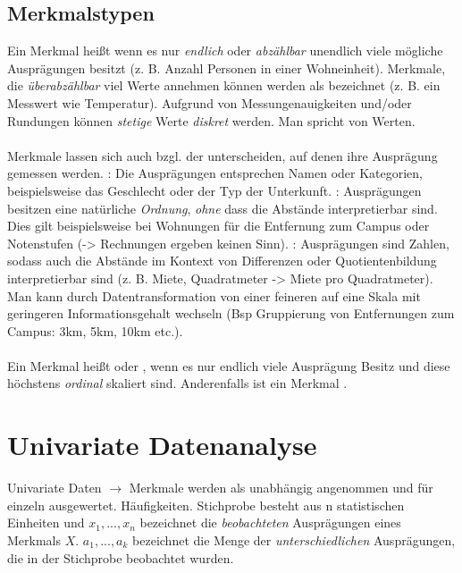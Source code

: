 \subsection{Merkmalstypen}
Ein Merkmal heißt  wenn es nur \emph{endlich} oder \emph{abzählbar} unendlich viele mögliche Ausprägungen besitzt (z. B. Anzahl Personen in einer Wohneinheit). Merkmale, die \emph{überabzählbar} viel Werte annehmen können werden als   bezeichnet (z. B. ein Messwert wie Temperatur). Aufgrund von Messungenauigkeiten und/oder Rundungen können \emph{stetige} Werte \emph{diskret} werden. Man spricht von  Werten. 
\\\\
Merkmale lassen sich auch bzgl. der  unterscheiden, auf denen ihre Ausprägung gemessen werden. : Die Ausprägungen entsprechen Namen oder Kategorien, beispielsweise das Geschlecht oder der Typ der Unterkunft. : Ausprägungen besitzen eine natürliche \emph{Ordnung}, \emph{ohne} dass
die Abstände interpretierbar sind. Dies gilt beispielsweise bei Wohnungen für die Entfernung zum Campus oder Notenstufen (-> Rechnungen ergeben keinen Sinn). 
: Ausprägungen sind Zahlen, sodass auch die Abstände im Kontext von Differenzen oder Quotientenbildung interpretierbar sind (z. B. Miete, Quadratmeter -> Miete pro Quadratmeter).
Man kann durch Datentransformation von einer feineren auf eine Skala mit geringeren Informationsgehalt wechseln (Bsp Gruppierung von Entfernungen zum Campus: 3km, 5km, 10km etc.).
\\\\
Ein Merkmal heißt  oder , wenn es nur endlich viele Ausprägung Besitz und diese höchstens \emph{ordinal} skaliert sind.
Anderenfalls ist ein Merkmal .


\section{Univariate Datenanalyse}
Univariate Daten $\rightarrow$ Merkmale werden als unabhängig angenommen und für einzeln ausgewertet. Häufigkeiten. Stichprobe besteht aus n statistischen Einheiten und $x_1, ..., x_n$ bezeichnet die \emph{beobachteten} Ausprägungen eines Merkmals $X$. $a_1, ..., a_k$ bezeichnet die Menge der \emph{unterschiedlichen} Ausprägungen, die in der Stichprobe beobachtet wurden.
